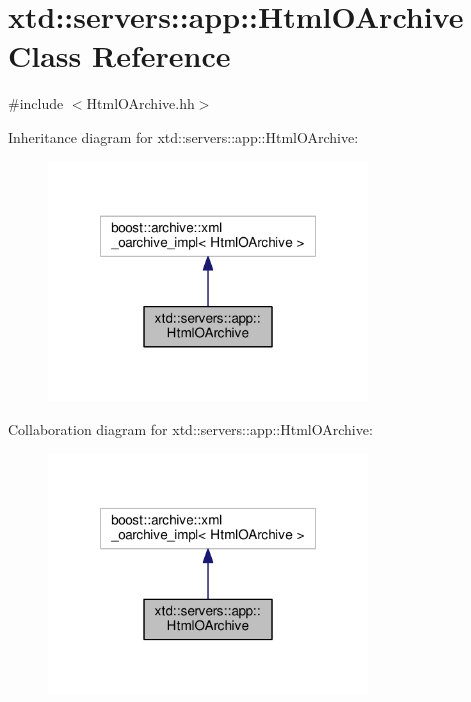 \hypertarget{classxtd_1_1servers_1_1app_1_1HtmlOArchive}{\section{xtd\-:\-:servers\-:\-:app\-:\-:Html\-O\-Archive Class Reference}
\label{classxtd_1_1servers_1_1app_1_1HtmlOArchive}
}


{\ttfamily \#include $<$Html\-O\-Archive.\-hh$>$}



Inheritance diagram for xtd\-:\-:servers\-:\-:app\-:\-:Html\-O\-Archive\-:
\nopagebreak
\begin{figure}[H]
\begin{center}
\leavevmode
\includegraphics[width=240pt]{classxtd_1_1servers_1_1app_1_1HtmlOArchive__inherit__graph}
\end{center}
\end{figure}


Collaboration diagram for xtd\-:\-:servers\-:\-:app\-:\-:Html\-O\-Archive\-:
\nopagebreak
\begin{figure}[H]
\begin{center}
\leavevmode
\includegraphics[width=240pt]{classxtd_1_1servers_1_1app_1_1HtmlOArchive__coll__graph}
\end{center}
\end{figure}
